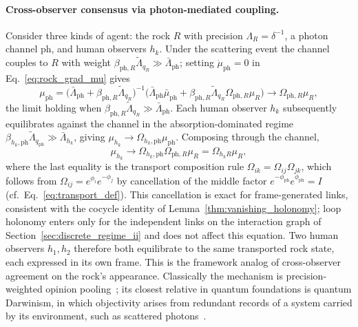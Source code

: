 \paragraph{Cross-observer consensus via photon-mediated coupling.} Consider three kinds of agent: the rock $R$ with precision $\Lambda_R = \delta^{-1}$, a photon channel $\mathrm{ph}$, and human observers $h_k$. Under the scattering event the channel couples to $R$ with weight $\beta_{\mathrm{ph},R}\tilde{\Lambda}_{q_R} \gg \bar{\Lambda}_{\mathrm{ph}}$; setting $\dot{\mu}_{\mathrm{ph}} = 0$ in Eq.~\eqref{eq:rock_grad_mu} gives
\begin{equation}
\mu_{\mathrm{ph}} = \big(\bar{\Lambda}_{\mathrm{ph}} + \beta_{\mathrm{ph},R}\tilde{\Lambda}_{q_R}\big)^{-1}\big(\bar{\Lambda}_{\mathrm{ph}} \bar{\mu}_{\mathrm{ph}} + \beta_{\mathrm{ph},R}\tilde{\Lambda}_{q_R}\Omega_{\mathrm{ph},R}\mu_R\big) \to \Omega_{\mathrm{ph},R} \mu_R,
\end{equation}
the limit holding when $\beta_{\mathrm{ph},R}\tilde{\Lambda}_{q_R} \gg \bar{\Lambda}_{\mathrm{ph}}$.
Each human observer $h_k$ subsequently equilibrates against the channel in the absorption-dominated regime $\beta_{h_k,\mathrm{ph}}\tilde{\Lambda}_{q_{\mathrm{ph}}} \gg \bar{\Lambda}_{h_k}$, giving $\mu_{h_k} \to \Omega_{h_k,\mathrm{ph}}\mu_{\mathrm{ph}}$. Composing through the channel,
\begin{equation}
\mu_{h_k} \to \Omega_{h_k,\mathrm{ph}} \Omega_{\mathrm{ph},R} \mu_R = \Omega_{h_k R} \mu_R,
\label{eq:rock_consensus}
\end{equation}
where the last equality is the transport composition rule $\Omega_{ik} = \Omega_{ij}\Omega_{jk}$, which follows from $\Omega_{ij} = e^{\phi_i}e^{-\phi_j}$ by cancellation of the middle factor $e^{-\phi_{\mathrm{ph}}}e^{\phi_{\mathrm{ph}}} = I$ (cf.\ Eq.~\eqref{eq:transport_def}). This cancellation is exact for frame-generated links, consistent with the cocycle identity of Lemma~\ref{thm:vanishing_holonomy}; loop holonomy enters only for the independent links on the interaction graph of Section~\ref{sec:discrete_regime_ii} and does not affect this equation. Two human observers $h_1, h_2$ therefore both equilibrate to the same transported rock state, each expressed in its own frame. This is the framework analog of cross-observer agreement on the rock's appearance. Classically the mechanism is precision-weighted opinion pooling~\cite{degroot1974}; its closest relative in quantum foundations is quantum Darwinism, in which objectivity arises from redundant records of a system carried by its environment, such as scattered photons~\cite{Zurek2009}.

